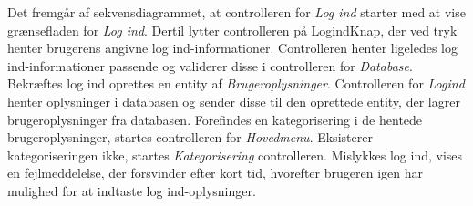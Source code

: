 \noindent
Det fremgår af sekvensdiagrammet, at controlleren for \textit{Log ind} starter med at vise grænsefladen for \textit{Log ind}. Dertil lytter controlleren på LogindKnap, der ved tryk henter brugerens angivne log ind-informationer. Controlleren henter ligeledes log ind-informationer passende og validerer disse i controlleren for \textit{Database}. Bekræftes log ind oprettes en entity af \textit{Brugeroplysninger}. Controlleren for \textit{Logind} henter oplysninger i databasen og sender disse til den oprettede entity, der lagrer brugeroplysninger fra databasen. Forefindes en kategorisering i de hentede brugeroplysninger, startes controlleren for \textit{Hovedmenu}. Eksisterer kategoriseringen ikke, startes \textit{Kategorisering} controlleren. Mislykkes log ind, vises en fejlmeddelelse, der forsvinder efter kort tid, hvorefter brugeren igen har mulighed for at indtaste log ind-oplysninger. 

